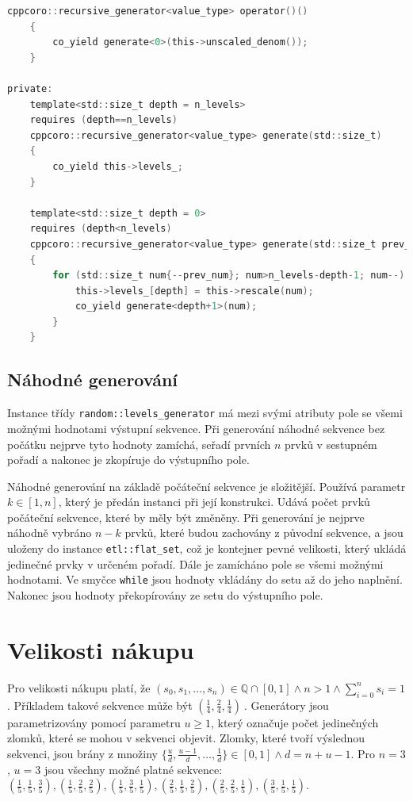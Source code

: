 \begin{lstlisting}[caption={~Metody pro systematické generování úrovní nákupu},label={lst:systematic:levels_generator},captionpos=t,abovecaptionskip=-\medskipamount,belowcaptionskip=\medskipamount,language=C]
    cppcoro::recursive_generator<value_type> operator()()
    {
        co_yield generate<0>(this->unscaled_denom());
    }

private:
    template<std::size_t depth = n_levels>
    requires (depth==n_levels)
    cppcoro::recursive_generator<value_type> generate(std::size_t)
    {
        co_yield this->levels_;
    }

    template<std::size_t depth = 0>
    requires (depth<n_levels)
    cppcoro::recursive_generator<value_type> generate(std::size_t prev_num)
    {
        for (std::size_t num{--prev_num}; num>n_levels-depth-1; num--) {
            this->levels_[depth] = this->rescale(num);
            co_yield generate<depth+1>(num);
        }
    }
\end{lstlisting}

\subsection{Náhodné generování}
Instance třídy \texttt{random::levels\_generator} má mezi svými atributy pole se všemi možnými hodnotami výstupní sekvence.
Při generování náhodné sekvence bez počátku nejprve tyto hodnoty zamíchá, seřadí prvních $n$ prvků v sestupném pořadí a nakonec je zkopíruje do výstupního pole.

Náhodné generování na základě počáteční sekvence je složitější.
Používá parametr $k \in [1, n] $, který je předán instanci při její konstrukci.
Udává počet prvků počáteční sekvence, které by měly být změněny.
Při generování je nejprve náhodně vybráno $n-k$ prvků, které budou zachovány z původní sekvence, a jsou uloženy do instance \texttt{etl::flat\_set}, což je kontejner pevné velikosti, který ukládá jedinečné prvky v určeném pořadí.
Dále je zamícháno pole se všemi možnými hodnotami.
Ve smyčce \texttt{while} jsou hodnoty vkládány do setu až do jeho naplnění.
Nakonec jsou hodnoty překopírovány ze setu do výstupního pole.

\section{Velikosti nákupu}
Pro velikosti nákupu platí, že $ (s_0, s_1,\dots,s_n) \in \mathbb{Q} \cap [0, 1] \land n>1 \land \sum_{i=0}^{n} s_i = 1 $.
Příkladem takové sekvence může být $ (\frac{1}{4}, \frac{2}{4}, \frac{1}{4})\ $.
Generátory jsou parametrizovány pomocí parametru $u\geq 1$, který označuje počet jedinečných zlomků, které se mohou v sekvenci objevit.
Zlomky, které tvoří výslednou sekvenci, jsou brány z množiny $\{\frac{u}{d}, \frac{u-1}{d},\dots, \frac{1}{d}\} \in [0, 1] \land d=n+u-1$.
Pro $n=3$, $u=3$ jsou všechny možné platné sekvence: $(\frac{1}{5}, \frac{1}{5}, \frac{3}{5}), (\frac{1}{5}, \frac{2}{5}, \frac{2}{5}), (\frac{1}{5}, \frac{3}{5}, \frac{1}{5}), (\frac{2}{5}, \frac{1}{5}, \frac{2}{5}), (\frac{2}{5}, \frac{2}{5}, \frac{1}{5}), (\frac{3}{5}, \frac{1}{5}, \frac{1}{5})$.

